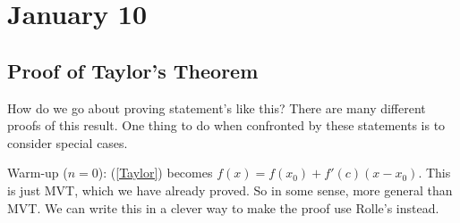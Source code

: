 \documentclass{article}
\theoremstyle{plain}
\theoremstyle{remark}
\begin{document}
\section{January 10}
\subsection{Proof of Taylor's Theorem}
How do we go about proving statement's like this?
There are many different proofs of this result.
One thing to do when confronted by these statements is to consider special cases.

Warm-up ($n = 0$): (\ref{Taylor}) becomes $f(x) = f(x_0) + f'(c)(x-x_0)$.
This is just MVT, which we have already proved.
So in some sense, more general than MVT.
We can write this in a clever way to make the proof use Rolle's instead.
\end{document}
